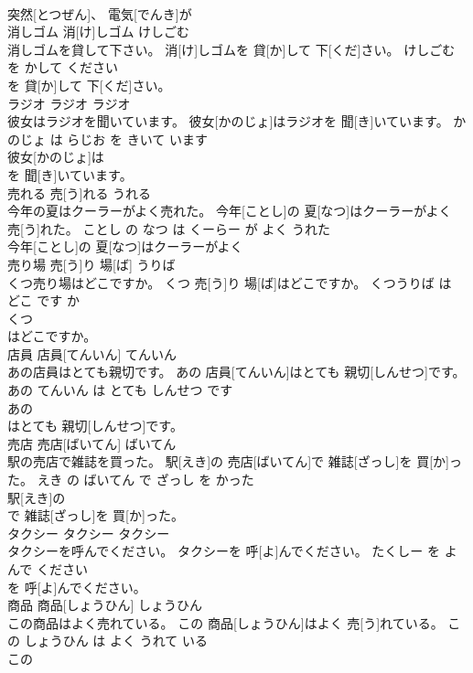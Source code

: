\documentclass[8pt]{extreport}
\begin{document}
\begin{CJK}{UTF8}{min}
\\	突然[とつぜん]、 電気[でんき]が
\\	消しゴム	消[け]しゴム	けしごむ	
\\	消しゴムを貸して下さい。	消[け]しゴムを 貸[か]して 下[くだ]さい。	けしごむ を かして ください	
\\	を 貸[か]して 下[くだ]さい。		
\\	ラジオ	ラジオ	ラジオ	
\\	彼女はラジオを聞いています。	彼女[かのじょ]はラジオを 聞[き]いています。	かのじょ は らじお を きいて います	
\\	彼女[かのじょ]は
\\	を 聞[き]いています。		
\\	売れる	売[う]れる	うれる	
\\	今年の夏はクーラーがよく売れた。	今年[ことし]の 夏[なつ]はクーラーがよく 売[う]れた。	ことし の なつ は くーらー が よく うれた	
\\	今年[ことし]の 夏[なつ]はクーラーがよく
\\	売り場	売[う]り 場[ば]	うりば	
\\	くつ売り場はどこですか。	くつ 売[う]り 場[ば]はどこですか。	くつうりば は どこ です か	
\\	くつ
\\	はどこですか。		
\\	店員	店員[てんいん]	てんいん	
\\	あの店員はとても親切です。	あの 店員[てんいん]はとても 親切[しんせつ]です。	あの てんいん は とても しんせつ です	
\\	あの
\\	はとても 親切[しんせつ]です。		
\\	売店	売店[ばいてん]	ばいてん	
\\	駅の売店で雑誌を買った。	駅[えき]の 売店[ばいてん]で 雑誌[ざっし]を 買[か]った。	えき の ばいてん で ざっし を かった	
\\	駅[えき]の
\\	で 雑誌[ざっし]を 買[か]った。		
\\	タクシー	タクシー	タクシー	
\\	タクシーを呼んでください。	タクシーを 呼[よ]んでください。	たくしー を よんで ください	
\\	を 呼[よ]んでください。		
\\	商品	商品[しょうひん]	しょうひん	
\\	この商品はよく売れている。	この 商品[しょうひん]はよく 売[う]れている。	この しょうひん は よく うれて いる	
\\	この

\end{CJK}
\end{document}
